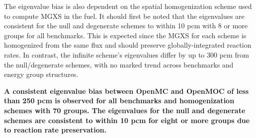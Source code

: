 
The eigenvalue bias is also dependent on the spatial homogenization scheme used to compute \ac{MGXS} in the fuel. It should first be noted that the eigenvalues are consistent for the null and degenerate schemes to within 10 \ac{pcm} with 8 or more groups for all benchmarks. This is expected since the \ac{MGXS} for each scheme is homogenized from the same flux and should preserve globally-integrated reaction rates. In contrast, the infinite scheme's eigenvalues differ by up to 300 \ac{pcm} from the null/degenerate schemes, with no marked trend across benchmarks and energy group structures.



\begin{emphbox}
\textbf{A consistent eigenvalue bias between OpenMC and OpenMOC of less than 250 \ac{pcm} is observed for all benchmarks and homogenization schemes with 70 groups. The eigenvalues for the null and degenerate schemes are consistent to within 10 \ac{pcm} for eight or more groups due to reaction rate preservation.}
\end{emphbox}

